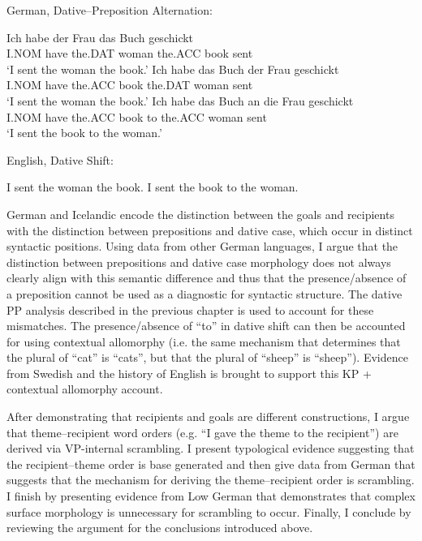 \begin{exe}
	\ex German, Dative--Preposition Alternation: \label{ex:german-forms}
	\begin{xlist}
		\ex \label{ex:german-1} \gll Ich habe der Frau das Buch geschickt\\
			I.NOM have the.DAT woman the.ACC book sent\\
			 \trans `I sent the woman the book.'
		 \ex \label{ex:german-2} \gll Ich habe das Buch der Frau geschickt\\
			 I.NOM have the.ACC book the.DAT woman sent\\
			 \trans `I sent the woman the book.'
		 \ex \label{ex:german-3} \gll Ich habe das Buch an die Frau geschickt\\
			 I.NOM have the.ACC book to the.ACC woman sent\\
			 \trans `I sent the book to the woman.'
	\end{xlist}
	\ex English, Dative Shift: \label{ex:dat-shift}
	\begin{xlist}
		\ex \label{ex:english-1} I sent the woman the book.
		\ex \label{ex:english-2} I sent the book to the woman.
	\end{xlist}
\end{exe}

German and Icelandic encode the distinction between the goals and recipients with the distinction between prepositions and dative case, which occur in distinct syntactic positions. Using data from other German languages, I argue that the distinction between prepositions and dative case morphology does not always clearly align with this semantic difference and thus that the presence/absence of a preposition cannot be used as a diagnostic for syntactic structure. The dative PP analysis described in the previous chapter is used to account for these mismatches. The presence/absence of ``to'' in dative shift can then be accounted for using contextual allomorphy (i.e. the same mechanism that determines that the plural of ``cat'' is ``cats'', but that the plural of ``sheep'' is ``sheep''). Evidence from Swedish and the history of English is brought to support this KP + contextual allomorphy account.

After demonstrating that recipients and goals are different constructions, I argue that theme--recipient word orders (e.g. ``I gave the theme to the recipient'') are derived via VP-internal scrambling. I present typological evidence suggesting that the recipient--theme order is base generated and then give data from German that suggests that the mechanism for deriving the theme--recipient order is scrambling. I finish by presenting evidence from Low German that demonstrates that complex surface morphology is unnecessary for scrambling to occur. Finally, I conclude by reviewing the argument for the conclusions introduced above.

